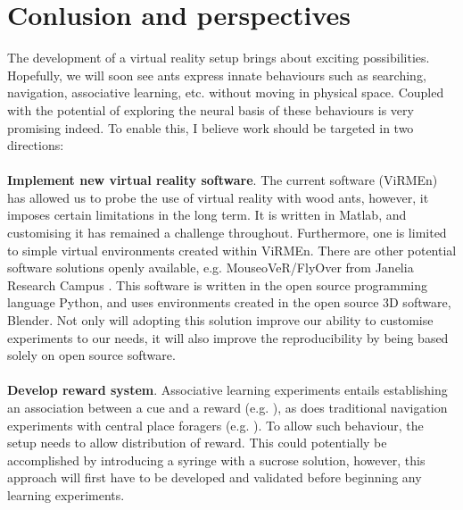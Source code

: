 \chapter{Conlusion and perspectives}
\label{chap:persp}
The development of a virtual reality setup brings about exciting possibilities. Hopefully, we will soon see ants express innate behaviours such as searching, navigation, associative learning, etc. without moving in physical space. Coupled with the potential of exploring the neural basis of these behaviours is very promising indeed.
To enable this, I believe work should be targeted in two directions: \\ \\
\textbf{Implement new virtual reality software}. The current software (ViRMEn) has allowed us to probe the use of virtual reality with wood ants, however, it imposes certain limitations in the long term. It is written in Matlab, and customising it has remained a challenge throughout. Furthermore, one is limited to simple virtual environments created within ViRMEn. There are other potential software solutions openly available, e.g. MouseoVeR/FlyOver from Janelia Research Campus \autocite{Cohen2017MouseoVeRLaboratory}. This software is written in the open source programming language Python, and uses environments created in the open source 3D software, Blender. Not only will adopting this solution improve our ability to customise experiments to our needs, it will also improve the reproducibility by being based solely on open source software. \\ \\
\textbf{Develop reward system}. Associative learning experiments entails establishing an association between a cue and a reward (e.g. \cite{Fernandes2017a}), as does traditional navigation experiments with central place foragers (e.g. \cite{Buehlmann2018TheCharacteristics}). To allow such behaviour, the setup needs to allow distribution of reward. This could potentially be accomplished by introducing a syringe with a sucrose solution, however, this approach will first have to be developed and validated before beginning any learning experiments. 
